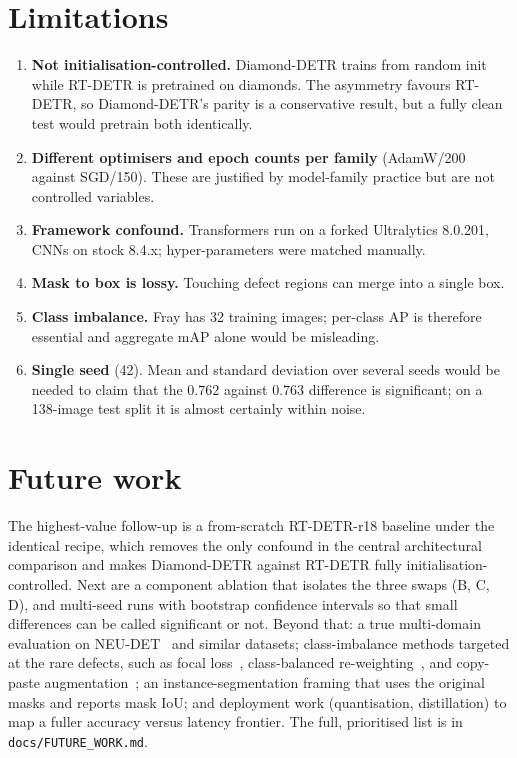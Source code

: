 \documentclass[11pt,a4paper]{article}
\begin{document}
\section{Limitations}\label{sec:limits}
\begin{enumerate}[leftmargin=1.5em,itemsep=2pt,topsep=2pt]
  \item \textbf{Not initialisation-controlled.} Diamond-DETR trains from random init while RT-DETR
        is pretrained on diamonds. The asymmetry favours RT-DETR, so Diamond-DETR's parity is a
        conservative result, but a fully clean test would pretrain both identically.
  \item \textbf{Different optimisers and epoch counts per family} (AdamW/200 against SGD/150). These
        are justified by model-family practice but are not controlled variables.
  \item \textbf{Framework confound.} Transformers run on a forked Ultralytics 8.0.201, CNNs on stock
        8.4.x; hyper-parameters were matched manually.
  \item \textbf{Mask to box is lossy.} Touching defect regions can merge into a single box.
  \item \textbf{Class imbalance.} Fray has 32 training images; per-class AP is therefore essential
        and aggregate mAP alone would be misleading.
  \item \textbf{Single seed} (42). Mean and standard deviation over several seeds would be needed to
        claim that the $0.762$ against $0.763$ difference is significant; on a 138-image test split
        it is almost certainly within noise.
\end{enumerate}

\section{Future work}
The highest-value follow-up is a from-scratch RT-DETR-r18 baseline under the identical recipe, which
removes the only confound in the central architectural comparison and makes Diamond-DETR against
RT-DETR fully initialisation-controlled. Next are a component ablation that isolates the three swaps
(B, C, D), and multi-seed runs with bootstrap confidence intervals so that small differences can be
called significant or not. Beyond that: a true multi-domain evaluation on NEU-DET~\cite{neu} and
similar datasets; class-imbalance methods targeted at the rare defects, such as focal
loss~\cite{focal}, class-balanced re-weighting~\cite{cb}, and copy-paste augmentation~\cite{copypaste};
an instance-segmentation framing that uses the original masks and reports mask IoU; and deployment
work (quantisation, distillation) to map a fuller accuracy versus latency frontier. The full,
prioritised list is in \texttt{docs/FUTURE\_WORK.md}.
\end{document}
